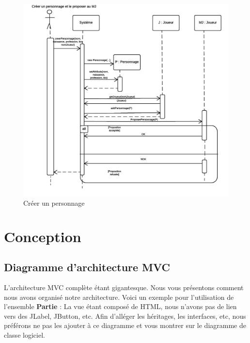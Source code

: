 \documentclass[a4paper,oneside,10pt]{article}
\begin{document}
\begin{figure}[H]
	\begin{center}
		\includegraphics[width=12cm]{images/sequence/DS-CreerPerso.png}  
		\caption{Créer un personnage}
	\end{center}
\end{figure}


\pagebreak

\section{Conception}


\subsection{Diagramme d'architecture MVC}

L'architecture MVC complète étant gigantesque. Nous vous présentons comment nous avons organisé notre architecture. 
Voici un exemple pour l'utilisation de l'ensemble \textbf{Partie} :
La vue étant composé de HTML, nous n'avons pas de lien vers des JLabel, JButton, etc. 
Afin d'alléger les héritages, les interfaces, etc, nous préférons ne pas les ajouter à ce diagramme et vous montrer sur le diagramme de classe logiciel. 
\end{document}
